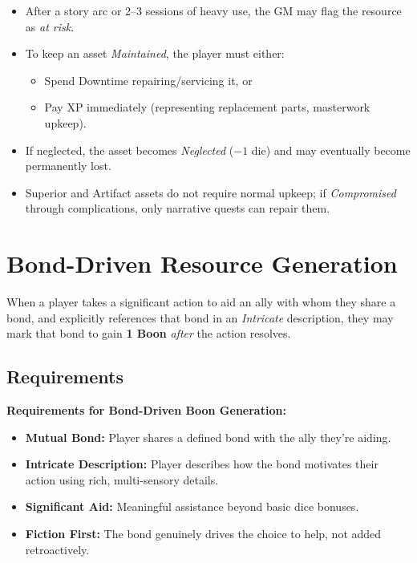 \begin{itemize}
\item After a story arc or 2--3 sessions of heavy use, the GM may flag the resource as \emph{at risk}. 
\item To keep an asset \emph{Maintained}, the player must either:
  \begin{itemize}
  \item Spend Downtime repairing/servicing it, or 
  \item Pay XP immediately (representing replacement parts, masterwork upkeep). 
  \end{itemize}
\item If neglected, the asset becomes \emph{Neglected} ($-1$ die) and may eventually become permanently lost. 
\item Superior and Artifact assets do not require normal upkeep; if \emph{Compromised} through complications, only narrative quests can repair them. 
\end{itemize}

\section{Bond-Driven Resource Generation}
\label{sec:bond-resources}

When a player takes a significant action to aid an ally with whom they share a bond, and explicitly references that bond in an \emph{Intricate} description, they may mark that bond to gain \textbf{1 Boon} \emph{after} the action resolves. 

\subsection{Requirements}
\label{subsec:bond-requirements}

\textbf{Requirements for Bond-Driven Boon Generation:}
\begin{itemize}
    \item \textbf{Mutual Bond:} Player shares a defined bond with the ally they're aiding. 
    \item \textbf{Intricate Description:} Player describes how the bond motivates their action using rich, multi-sensory details. 
    \item \textbf{Significant Aid:} Meaningful assistance beyond basic dice bonuses. 
    \item \textbf{Fiction First:} The bond genuinely drives the choice to help, not added retroactively. 
\end{itemize}


